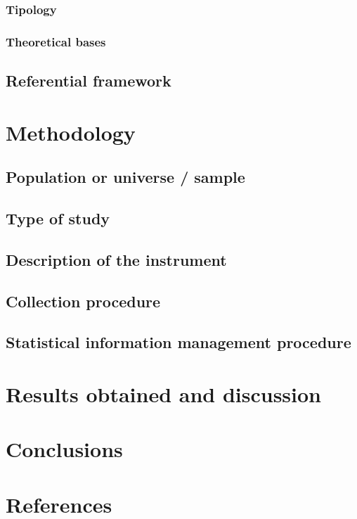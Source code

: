 \documentclass[preprint,12pt]{elsarticle}
\begin{document}
		\subsubsection{Tipology}
		\subsubsection{Theoretical bases}
	\subsection{Referential framework}
\newpage
\section{Methodology}
	\subsection{Population or universe / sample}
	\subsection{Type of study}
	\subsection{Description of the instrument}
	\subsection{Collection procedure}
	\subsection{Statistical information management procedure}

\newpage
\section{Results obtained and discussion}

\newpage
\section{Conclusions}

\newpage
\section{References}

\end{document}
